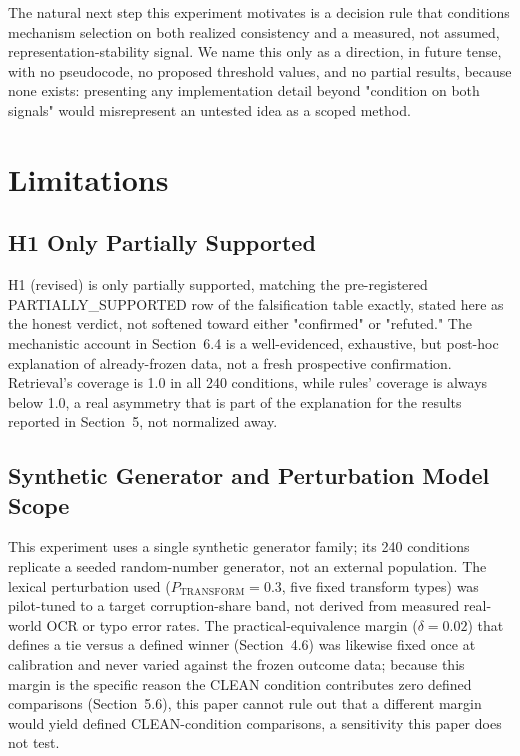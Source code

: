 \documentclass[11pt]{article}
\begin{document}
The natural next step this experiment motivates is a decision rule that
conditions mechanism selection on both realized consistency and a measured,
not assumed, representation-stability signal. We name this only as a
direction, in future tense, with no pseudocode, no proposed threshold values,
and no partial results, because none exists: presenting any implementation
detail beyond "condition on both signals" would misrepresent an untested idea
as a scoped method.

\section{Limitations}
\label{sec:limitations}

\subsection{H1 Only Partially Supported}
\label{sec:limits-h1}

H1 (revised) is only partially supported, matching the pre-registered
PARTIALLY\_SUPPORTED row of the falsification table exactly, stated here as
the honest verdict, not softened toward either "confirmed" or "refuted." The
mechanistic account in Section~6.4 is a well-evidenced, exhaustive, but
post-hoc explanation of already-frozen data, not a fresh prospective
confirmation. Retrieval's coverage is 1.0 in all 240 conditions, while
rules' coverage is always below 1.0, a real asymmetry that is part of the
explanation for the results reported in Section~5, not normalized away.

\subsection{Synthetic Generator and Perturbation Model Scope}
\label{sec:limits-generator-scope}

This experiment uses a single synthetic generator family; its 240 conditions
replicate a seeded random-number generator, not an external population. The
lexical perturbation used ($P_{\mathrm{TRANSFORM}}=0.3$, five fixed transform
types) was pilot-tuned to a target corruption-share band, not derived from
measured real-world OCR or typo error rates. The practical-equivalence
margin ($\delta=0.02$) that defines a tie versus a defined winner
(Section~4.6) was likewise fixed once at calibration and never varied
against the frozen outcome data; because this margin is the specific reason
the CLEAN condition contributes zero defined comparisons (Section~5.6), this
paper cannot rule out that a different margin would yield defined
CLEAN-condition comparisons, a sensitivity this paper does not test.
\end{document}
